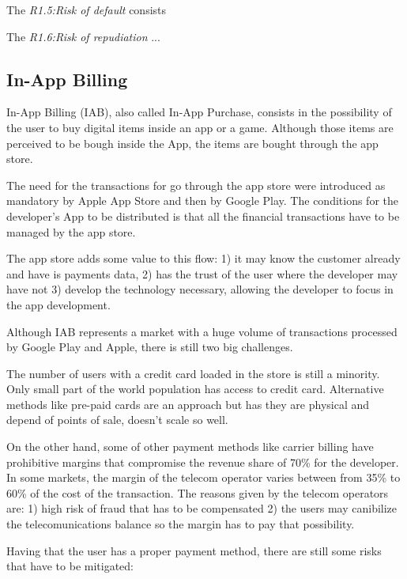 \medskip

The {\em R1.5:Risk of default} consists

\medskip

The {\em R1.6:Risk of repudiation} ...


\subsection{In-App Billing}


In-App Billing (IAB), also called In-App Purchase, consists in the possibility of the user to buy digital items inside an app or a game. Although those items are perceived to be bough inside the App, the items are bought through the app store.

The need for the transactions for go through the app store were introduced as mandatory by Apple App Store and then by Google Play. The conditions for the developer's App to be distributed is that all the financial transactions have to be managed by the app store. 

The app store adds some value to this flow: 1) it may know the customer already and have is payments data, 2) has the trust of the user where the developer may have not 3) develop the technology necessary, allowing the developer to focus in the app development.

Although IAB represents a market with a huge volume of transactions processed by Google Play and Apple, there is still two big challenges.

The number of users with a credit card loaded in the store is still a minority. Only small part of the world population has access to credit card. Alternative methods like pre-paid cards are an approach but has they are physical and depend of points of sale, doesn't scale so well.

On the other hand, some of other payment methods like carrier billing have prohibitive margins that compromise the revenue share of 70\% for the developer. In some markets, the margin of the telecom operator varies between from 35\% to 60\% of the cost of the transaction. The reasons given by the telecom operators are: 1) high risk of fraud that has to be compensated 2) the users may canibilize the telecomunications balance so the margin has to pay that possibility.

Having that the user has a proper payment method, there are still some risks that have to be mitigated:

